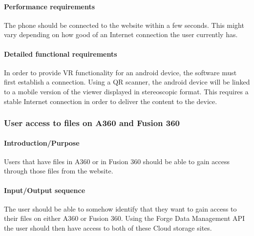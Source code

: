 \documentclass[letterpaper, 10pt, draftclsnofoot, compsoc, onecolumn]{IEEEtran}
\begin{document}
\paragraph[Performance requirements of this
feature]{\rmfamily\bfseries\color{black}
Performance requirements }

{\color{black}
	The phone should be connected to the website within a few seconds. This might vary depending on how good of an Internet 
	connection the user currently has. 
}

\paragraph[Detailed functional requirements of this
feature]{\rmfamily\bfseries\color{black}
Detailed functional requirements }
{\color{black}
	In order to provide VR functionality for an android device, the software must first establish a connection. Using a QR scanner, 
	the android device will be linked to a mobile version of the viewer displayed in stereoscopic format. This requires a stable 
	Internet connection in order to deliver the content to the device.
 }


\subsubsection[{Data Management}]{\rmfamily\bfseries\color{black}  
	User access to files on A360 and Fusion 360
}
\smallskip
\paragraph[Introduction/Purpose of this
feature]{\rmfamily\bfseries\color{black}
Introduction/Purpose }
{\color{black}
	Users that have files in A360 or in Fusion 360 should be able to gain access through those files from the
	website.
}

\paragraph[Input/Output sequence]{\rmfamily\bfseries\color{black}
Input/Output sequence }
{\color{black}
	The user should be able to somehow identify that they want to gain access to their files on either A360
	or Fusion 360. Using the Forge Data Management API the user should then have access to both of these
	Cloud storage sites.
}
\end{document}

